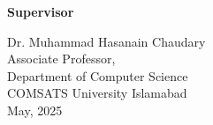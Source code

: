 \noindent\large{\textbf{Supervisor}}
\begin{flushleft}
\vspace{0.3in}
\large{Dr. Muhammad Hasanain Chaudary\\
\vspace{0.1in}
Associate Professor,\\
Department of Computer Science\\
\vspace{0.1in}
COMSATS University Islamabad\\

\vspace{0.2in}
May, 2025 }
\end{flushleft}
